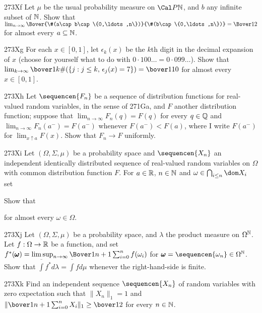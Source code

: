 {\spheader 273Xf Let $\mu$ be the usual probability measure on
$\Cal P\Bbb N$, and $b$ any infinite subset of $\Bbb N$.   Show that
$\lim_{n\to\infty}
\Bover{\#(a\cap b\cap\{0,\ldots,n\})}{\#(b\cap\{0,\ldots,n\})}
\penalty-100=\Bover12$ for almost every $a\subseteq\Bbb N$.

\sqheader 273Xg For each $x\in[0,1]$, let $\epsilon_k(x)$ be the
$k$th digit in the decimal expansion of $x$ (choose for yourself what to
do with $0{\cdot}100\ldots=0{\cdot}099\ldots$).   Show that
$\lim_{k\to\infty}\bover1k\#(\{j:j\le k,\,\epsilon_j(x)=7\})
=\bover1{10}$ for almost every $x\in[0,1]$.

\spheader 273Xh Let $\sequencen{F_n}$ be a sequence of
distribution functions for real-valued random variables, in the sense of
271Ga, and $F$ another
distribution function;  suppose that $\lim_{n\to\infty}F_n(q)=F(q)$ for
every $q\in\Bbb Q$ and $\lim_{n\to\infty}F_n(a^-)=F(a^-)$ whenever
$F(a^-)<F(a)$, where I write $F(a^-)$ for $\lim_{x\uparrow a}F(x)$.
Show that $F_n\to F$ uniformly.

\sqheader 273Xi
Let $(\Omega,\Sigma,\mu)$ be a probability space
and $\sequencen{X_n}$ an independent identically distributed sequence of
real-valued random
variables on $\Omega$ with common distribution function $F$.   For
$a\in\Bbb R$, $n\in\Bbb N$ and $\omega\in\bigcap_{i\le n}\dom X_i$ set


\noindent Show that


\noindent for almost every $\omega\in\Omega$.

\spheader 273Xj Let $(\Omega,\Sigma,\mu)$ be a probability space, and
$\lambda$ the product measure on $\Omega^{\Bbb N}$.
Let $f:\Omega\to\Bbb R$ be a function, and set $f^*(\pmb{\omega})
=\limsup_{n\to\infty}\Bover1{n+1}\sum_{i=0}^nf(\omega_i)$
for $\pmb{\omega}=\sequencen{\omega_n}\in\Omega^{\Bbb N}$.
Show that  $\overline{\int}f^*d\lambda=\overline{\int}fd\mu$ whenever
the right-hand-side is finite.

\spheader 273Xk Find an independent sequence $\sequencen{X_n}$ of random
variables with zero expectation such that $\|X_n\|_1=1$ and
$\|\bover1{n+1}\sum_{i=0}^nX_i\|_1\ge\bover12$ for every $n\in\Bbb N$.

}
